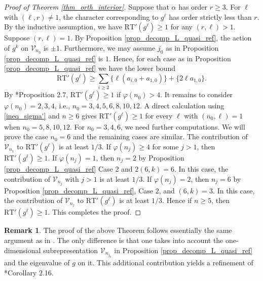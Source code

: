 \documentclass[11pt]{amsart}
\theoremstyle{plain}
\theoremstyle{definition}
\newtheorem{rem}[thm]{Remark}
\numberwithin{equation}{section}
\newcommand{\calV}{\mathcal{V}}
\begin{document}
\begin{proof}[Proof of Theorem \ref{thm_orth_interior}]
        Suppose that $\alpha$ has order $r\geq3$.
        For $\ell$ with $(\ell,r)\neq1$, the character corresponding to $g^\ell$ has order strictly less than $r$.
    By the inductive assumption, we have $\mathrm{RT}'(g^\ell) \geq 1$ for any $(r,\ell) > 1$.
    Suppose $(r,\ell) = 1$.
    By Proposition \ref{prop_decomp_L_quasi_ref}, the action of $g^k$ on $\calV_{n_0}$ is $\pm 1$.
    Furthermore, we may assume $j_0$ as in Proposition \ref{prop_decomp_L_quasi_ref} is $1$.
    Hence, for each case as in Proposition \ref{prop_decomp_L_quasi_ref} we have the lower bound
    \begin{equation}\label{ineq_sigma'}
    \mathrm{RT}'(g^\ell) \geq \sum_{i \geq 2} \bigl\{\ell( a_{i,0}+a_{1,0})\} + \bigl\{2\ell a_{1,0}\}.
    \end{equation}
    By \cite{Gritsenko2007kodaira}*{Proposition 2.7}, $\mathrm{RT}'(g^\ell) \geq 1$ if $\varphi(n_0) > 4$.
    It remains to consider $\varphi(n_0) = 2,3,4$, i.e., $n_0 = 3,4,5,6,8,10,12$.
    A direct calculation using \eqref{ineq_sigma'} and $n \geq 6$ gives $\mathrm{RT}'(g^\ell)\geq1$ for every $\ell$ with $(n_0,\ell)=1$ when $n_0 = 5,8,10,12$.
    For $n_0 = 3,4,6$, we need further computations.
    We will prove the case $n_0 = 6$ and the remaining cases are similar.
    The contribution of $\calV_{n_1}$ to $\mathrm{RT}'(g^\ell)$ is at least $1/3$.
    If $\varphi(n_j) \geq 4$ for some $j>1$, then $\mathrm{RT}'(g^\ell) \geq 1$.
    If $\varphi(n_j) = 1$, then $n_j = 2$ by Proposition \ref{prop_decomp_L_quasi_ref} Case 2 and $2(6, k) = 6$.
    In this case, the contribution of $\calV_{n_j}$ with $j>1$ is at least $1/3$.
        If $\varphi(n_j)=2$, then $n_j=6$ by Proposition \ref{prop_decomp_L_quasi_ref}, Case 2, and $(6,k)=3$.
    In this case, the contribution of $\calV_{n_j}$ to $\mathrm{RT}'(g^\ell)$ is at least $1/3$.
    Hence if $n \geq 5$, then $\mathrm{RT}'(g^\ell) \geq 1$.
    This completes the proof.
\end{proof}

\begin{rem}
    The proof of the above Theorem follows essentially the same argument as in \cite{Gritsenko2007kodaira}.
        The only difference is that one takes into account the one-dimensional subrepresentation $\calV_{n_{j_0}}$ in Proposition \ref{prop_decomp_L_quasi_ref} and the eigenvalue of $g$ on it.
    This additional contribution yields a refinement of \cite{Gritsenko2007kodaira}*{Corollary 2.16}.
\end{rem}
\end{document}
